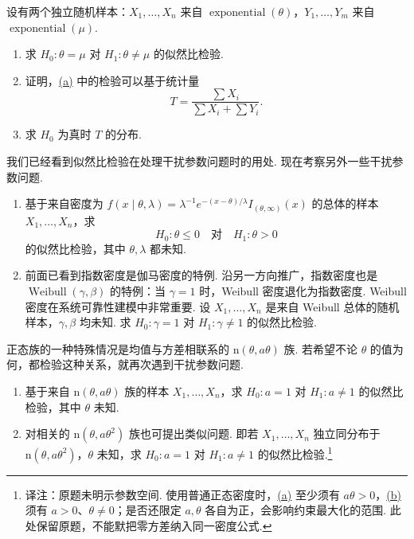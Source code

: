 \begin{exercise}\label{exercise:8.6}
设有两个独立随机样本：$X_1,\ldots,X_n$ 来自 $\operatorname{exponential}(\theta)$，$Y_1,\ldots,Y_m$ 来自 $\operatorname{exponential}(\mu)$.
\begin{enumerate}
\item{}\label{itm:exercise:8.6:a} 求 $H_0:\theta=\mu$ 对 $H_1:\theta\ne\mu$ 的似然比检验.
\item 证明，\hyperref[itm:exercise:8.6:a]{(a)} 中的检验可以基于统计量
$$T=\frac{\sum X_i}{\sum X_i+\sum Y_i}.$$
\item 求 $H_0$ 为真时 $T$ 的分布.
\end{enumerate}
\end{exercise}
\begin{exercise}\label{exercise:8.7}
我们已经看到似然比检验在处理干扰参数问题时的用处. 现在考察另外一些干扰参数问题.
\begin{enumerate}
\item 基于来自密度为 $f(x\mid\theta,\lambda)=\lambda^{-1}e^{-(x-\theta)/\lambda}I_{(\theta,\infty)}(x)$ 的总体的样本 $X_1,\ldots,X_n$，求
$$H_0:\theta\le0\quad\text{对}\quad H_1:\theta>0$$
的似然比检验，其中 $\theta,\lambda$ 都未知.
\item 前面已看到指数密度是伽马密度的特例. 沿另一方向推广，指数密度也是 $\operatorname{Weibull}(\gamma,\beta)$ 的特例：当 $\gamma=1$ 时，Weibull 密度退化为指数密度. Weibull 密度在系统可靠性建模中非常重要. 设 $X_1,\ldots,X_n$ 是来自 Weibull 总体的随机样本，$\gamma,\beta$ 均未知. 求 $H_0:\gamma=1$ 对 $H_1:\gamma\ne1$ 的似然比检验.
\end{enumerate}
\end{exercise}
\begin{exercise}\label{exercise:8.8}
正态族的一种特殊情况是均值与方差相联系的 $\mathrm n(\theta,a\theta)$ 族. 若希望不论 $\theta$ 的值为何，都检验这种关系，就再次遇到干扰参数问题.
\begin{enumerate}
\item{}\label{itm:exercise:8.8:a} 基于来自 $\mathrm n(\theta,a\theta)$ 族的样本 $X_1,\ldots,X_n$，求 $H_0:a=1$ 对 $H_1:a\ne1$ 的似然比检验，其中 $\theta$ 未知.
\item{}\label{itm:exercise:8.8:b} 对相关的 $\mathrm n(\theta,a\theta^2)$ 族也可提出类似问题. 即若 $X_1,\ldots,X_n$ 独立同分布于 $\mathrm n(\theta,a\theta^2)$，$\theta$ 未知，求 $H_0:a=1$ 对 $H_1:a\ne1$ 的似然比检验.\footnote{译注：原题未明示参数空间. 使用普通正态密度时，\hyperref[itm:exercise:8.8:a]{(a)} 至少须有 $a\theta>0$，\hyperref[itm:exercise:8.8:b]{(b)} 须有 $a>0$、$\theta\ne0$；是否还限定 $a,\theta$ 各自为正，会影响约束最大化的范围. 此处保留原题，不能默把零方差纳入同一密度公式.}
\end{enumerate}
\end{exercise}
